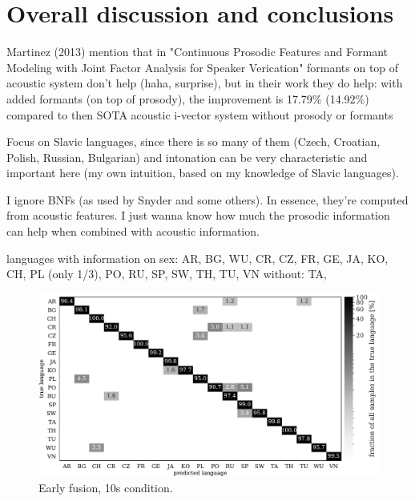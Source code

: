 \documentclass[bsc,frontabs,twoside,singlespacing,parskip,deptreport]{infthesis}
\begin{document}
\chapter{Overall discussion and conclusions}{
  \label{chap:discussion-and-conclusions}

  Martinez (2013) mention that in "Continuous Prosodic Features and Formant Modeling with Joint Factor Analysis for Speaker Verication" formants on top of acoustic system don't help (haha, surprise), but in their work they do help: with added formants (on top of prosody), the improvement is 17.79\% (14.92\%) compared to then SOTA acoustic i-vector system without prosody or formants

  Focus on Slavic languages, since there is so many of them (Czech, Croatian, Polish, Russian, Bulgarian) and intonation can be very characteristic and important here (my own intuition, based on my knowledge of Slavic languages).
  
  I ignore BNFs (as used by Snyder and some others). In essence, they're computed from acoustic features. I just wanna know how much the prosodic information can help when combined with acoustic information.

  languages with information on sex: AR, BG, WU, CR, CZ, FR, GE, JA, KO, CH, PL (only 1/3), PO, RU, SP, SW, TH, TU, VN 
  without: TA, 

  \begin{figure}[h!]
    \centering
    \includegraphics[width=\textwidth]{../img/cfmtrx_fusion_mfcc_deltas+pitch_energy.pdf}
    \caption{Early fusion, 10s condition.}
    \label{fig:summary-early-10s}
  \end{figure}

}
\end{document}
